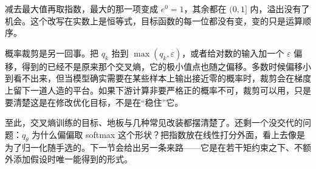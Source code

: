 减去最大值再取指数，最大的那一项变成 \(e^0=1\)，其余都在 \((0,1]\) 内，溢出没有了机会。这个改写在实数上是恒等式，目标函数的每一位都没有变，变的只是运算顺序。

概率裁剪是另一回事。把 \(q_k\) 抬到 \(\max(q_k,\varepsilon)\)，或者给对数的输入加一个 \(\varepsilon\) 偏移，得到的已经不是原来那个交叉熵，它的极小值点也随之偏移。多数时候偏移小到看不出来，但当模型确实需要在某些样本上输出接近零的概率时，裁剪会在梯度上留下一道人造的平台。如果下游计算非要严格正的概率不可，裁剪可以用，只是要清楚这是在修改优化目标，不是在``稳住''它。

至此，交叉熵训练的目标、地板与几种常见改装都摆清楚了。还剩一个没交代的问题：\(q_\theta\) 为什么偏偏取 softmax 这个形状？把指数放在线性打分外面，看上去像是为了归一化随手选的。下一节会给出另一条来路——它是在若干矩约束之下、不额外添加假设时唯一能得到的形式。
